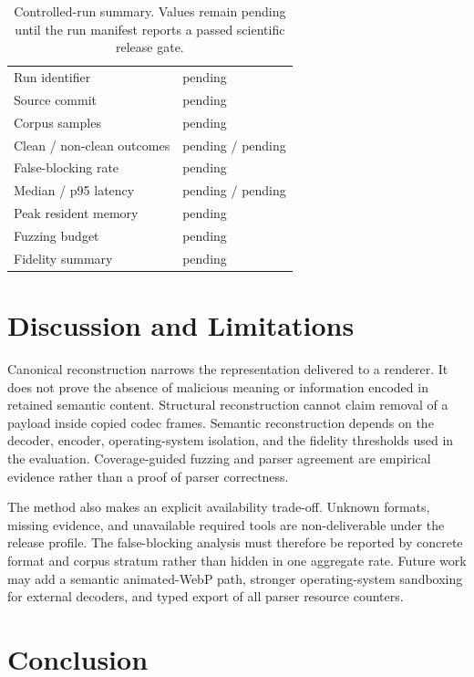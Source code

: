 \documentclass[preprint,12pt]{elsarticle}
\newcommand{\AFDRunID}{pending}%
\newcommand{\AFDCommit}{pending}%
\newcommand{\AFDCorpusSamples}{pending}%
\newcommand{\AFDAcceptedSamples}{pending}%
\newcommand{\AFDBlockedSamples}{pending}%
\newcommand{\AFDFalseBlockingRate}{pending}%
\newcommand{\AFDMedianLatency}{pending}%
\newcommand{\AFDPninetyfiveLatency}{pending}%
\newcommand{\AFDPeakMemory}{pending}%
\newcommand{\AFDFuzzBudget}{pending}%
\newcommand{\AFDFidelitySummary}{pending}%
\begin{document}
\begin{table}[t]
\centering
\caption{Controlled-run summary. Values remain pending until the run manifest
reports a passed scientific release gate.}
\label{tab:results}
\begin{tabular}{ll}
\toprule
Run identifier & \AFDRunID \\
Source commit & \AFDCommit \\
Corpus samples & \AFDCorpusSamples \\
Clean / non-clean outcomes & \AFDAcceptedSamples{} / \AFDBlockedSamples \\
False-blocking rate & \AFDFalseBlockingRate \\
Median / p95 latency & \AFDMedianLatency{} / \AFDPninetyfiveLatency \\
Peak resident memory & \AFDPeakMemory \\
Fuzzing budget & \AFDFuzzBudget \\
Fidelity summary & \AFDFidelitySummary \\
\bottomrule
\end{tabular}
\end{table}

\section{Discussion and Limitations}\label{sec:discussion}

Canonical reconstruction narrows the representation delivered to a renderer.
It does not prove the absence of malicious meaning or information encoded in
retained semantic content. Structural reconstruction cannot claim removal of a
payload inside copied codec frames. Semantic reconstruction depends on the
decoder, encoder, operating-system isolation, and the fidelity thresholds used
in the evaluation. Coverage-guided fuzzing and parser agreement are empirical
evidence rather than a proof of parser correctness.

The method also makes an explicit availability trade-off. Unknown formats,
missing evidence, and unavailable required tools are non-deliverable under the
release profile. The false-blocking analysis must therefore be reported by
concrete format and corpus stratum rather than hidden in one aggregate rate.
Future work may add a semantic animated-WebP path, stronger operating-system
sandboxing for external decoders, and typed export of all parser resource
counters.

\section{Conclusion}\label{sec:conclusion}
\end{document}
